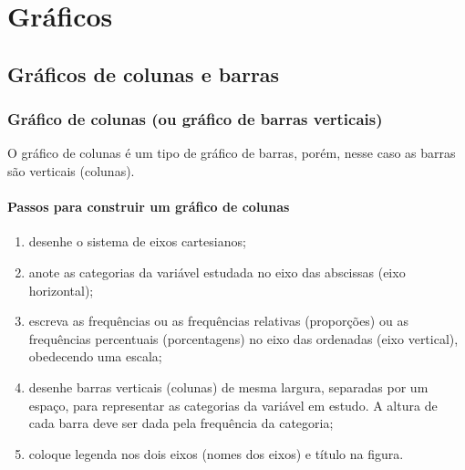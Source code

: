 \documentclass[11pt,fleqn]{book} %
\begin{document}
\chapter{Gráficos}

\section{Gráficos de colunas e barras}

\subsection{Gráfico de colunas (ou gráfico de barras verticais)}

O gráfico de colunas é um tipo de gráfico de barras, porém, nesse caso as barras são verticais (colunas). 

\subsubsection{Passos para construir um gráfico de colunas} 

\begin{enumerate}
\item desenhe o sistema de eixos cartesianos;

\item anote as categorias da variável estudada no eixo das abscissas (eixo horizontal);

\item escreva as frequências ou as frequências relativas (proporções) ou as frequências percentuais (porcentagens) no eixo das ordenadas (eixo vertical), obedecendo uma escala;

\item desenhe barras verticais (colunas) de mesma largura, separadas por um espaço, para representar as categorias da variável em estudo. A altura de cada barra deve ser dada pela frequência da categoria;

\item coloque legenda nos dois eixos (nomes dos eixos) e título na figura. \\

\end{enumerate}
\end{document}

